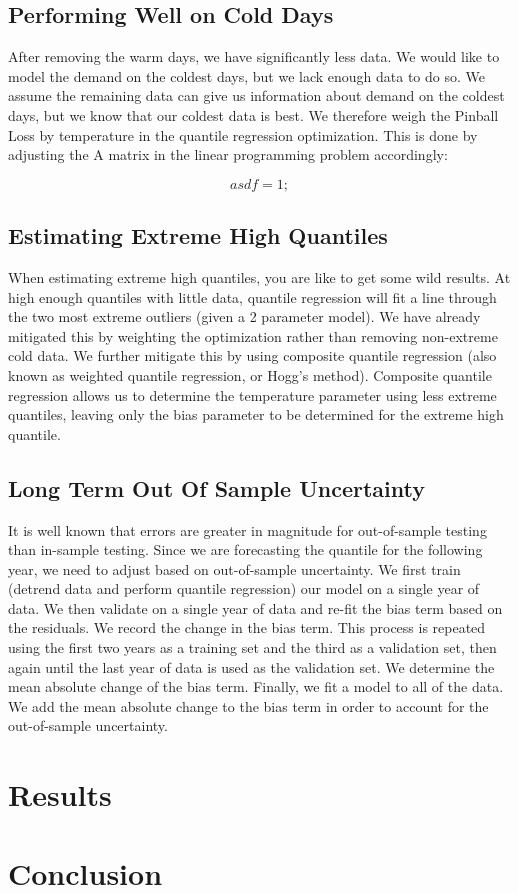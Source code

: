 \documentclass{article}
\begin{document}
\subsection{Performing Well on Cold Days}

After removing the warm days, we have significantly less data. We would like to model the demand on the coldest days, but we lack enough data to do so. We assume the remaining data can give us information about demand on the coldest days, but we know that our coldest data is best. We therefore weigh the Pinball Loss by temperature in the quantile regression optimization. This is done by adjusting the A matrix in the linear programming problem accordingly:

\begin{equation}
    asdf = 1;
\end{equation}

\subsection{Estimating Extreme High Quantiles}

When estimating extreme high quantiles, you are like to get some wild results. At high enough quantiles with little data, quantile regression will fit a line through the two most extreme outliers (given a 2 parameter model). We have already mitigated this by weighting the optimization rather than removing non-extreme cold data. We further mitigate this by using composite quantile regression (also known as weighted quantile regression, or Hogg's method). Composite quantile regression allows us to determine the temperature parameter using less extreme quantiles, leaving only the bias parameter to be determined for the extreme high quantile.

\subsection{Long Term Out Of Sample Uncertainty}

It is well known that errors are greater in magnitude for out-of-sample testing than in-sample testing. Since we are forecasting the quantile for the following year, we need to adjust based on out-of-sample uncertainty. We first train (detrend data and perform quantile regression) our model on a single year of data. We then validate on a single year of data and re-fit the bias term based on the residuals. We record the change in the bias term. This process is repeated using the first two years as a training set and the third as a validation set, then again until the last year of data is used as the validation set. We determine the mean absolute change of the bias term. Finally, we fit a model to all of the data. We add the mean absolute change to the bias term in order to account for the out-of-sample uncertainty.

\section{Results}




\section{Conclusion}






\end{document}

